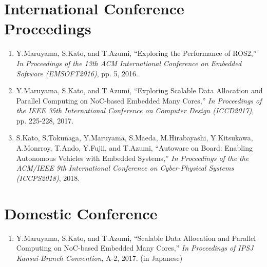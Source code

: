\documentclass[a4j,12pt,oneside,openany,english]{jsbook}
\begin{document}
\section*{International Conference Proceedings}
\begin{enumerate}
\item Y.Maruyama, S.Kato, and T.Azumi,
  ``{Exploring the Performance of ROS2},''
  \emph{In Proceedings of the 13th ACM International Conference on Embedded Software (EMSOFT2016)}, pp. 5, 2016.
\item Y.Maruyama, S.Kato, and T.Azumi,
  ``{Exploring Scalable Data Allocation and Parallel Computing on NoC-based Embedded Many Cores},''
  \emph{In Proceedings of the IEEE 35th International Conference on Computer Design (ICCD2017)}, pp. 225-228, 2017.
\item S.Kato, S.Tokunaga, Y.Maruyama, S.Maeda, M.Hirabayashi, Y.Kitsukawa, A.Monrroy, T.Ando, Y.Fujii, and T.Azumi,
  ``{Autoware on Board: Enabling Autonomous Vehicles with Embedded Systems},''
  \emph{In Proceedings of the the ACM/IEEE 9th International Conference on Cyber-Physical Systems (ICCPS2018)}, 2018.
\end{enumerate}

\section*{Domestic Conference}
\begin{enumerate}
\item Y.Maruyama, S.Kato, and T.Azumi,
  ``{Scalable Data Allocation and Parallel Computing on NoC-based Embedded Many Cores},''
  \emph{In Proceedings of IPSJ Kansai-Branch Convention}, A-2, 2017.
  (in Japanese)
\end{enumerate}
\end{document}
